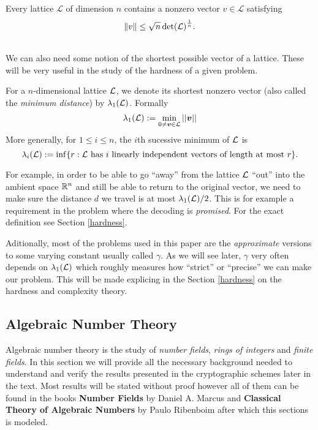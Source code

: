 \begin{theorem}
    Every lattice $\mathcal{L}$ of dimension $n$ contains a nonzero vector $v \in \mathcal{L}$ satisfying
    $$ \norm{v} \leq \sqrt{n} \det(\mathcal{L})^{\frac{1}{n}}.$$
\end{theorem}
\\
\fi
We can also need some notion of the shortest possible vector of a lattice. These will be very useful in the study of the hardness of a given problem.
\begin{definition}
	For a $n$-dimensional lattice $\mathcal{L}$, we denote its shortest nonzero vector (also called the \textit{minimum distance}) by $\lambda_1(\mathcal{L})$. Formally
	\[ \lambda_1(\mathcal{L}) := \min_{0 \neq \boldsymbol{v} \in \mathcal{L}} ||\boldsymbol{v}|| \]
	More generally, for $1 \leq i \leq n$, the $i$th sucessive minimum of $\mathcal{L}$ is
	\[\lambda_i(\mathcal{L}) := \inf \{r : \mathcal{L} \text{ has $i$ linearly independent vectors of length at most } r \}. \]
\end{definition}
For example, in order to be able to go ``away'' from the lattice $\mathcal{L}$ ``out'' into the ambient space $\mathbb{R}^n$ and still be able to return to the original vector, we need to make sure the distance $d$ we travel is at most $\lambda_1(\mathcal{L})/2$. This is for example a requirement in the  problem where the decoding is \textit{promised}. For the exact definition see Section \ref{hardness}.

Aditionally, most of the problems used in this paper are the \textit{approximate} versions to some varying constant usually called $\gamma$. As we will see later, $\gamma$ very often depends on $\lambda_1(\mathcal{L})$ which roughly measures how ``strict'' or ``precise'' we can make our problem. This will be made explicing in the Section \ref{hardness} on the hardness and complexity theory.

\subsection{Algebraic Number Theory}
Algebraic number theory is the study of \textit{number fields}, \textit{rings of integers} and \textit{finite fields}. In this section we will provide all the necessary background needed to understand and verify the results presented in the cryptographic schemes later in the text. Most results will be stated without proof however all of them can be found in the books \textbf{Number Fields} by Daniel A. Marcus \cite{algebra} and \textbf{Classical Theory of Algebraic Numbers} by Paulo Ribenboim \cite{ribenboim} after which this sections is modeled.

